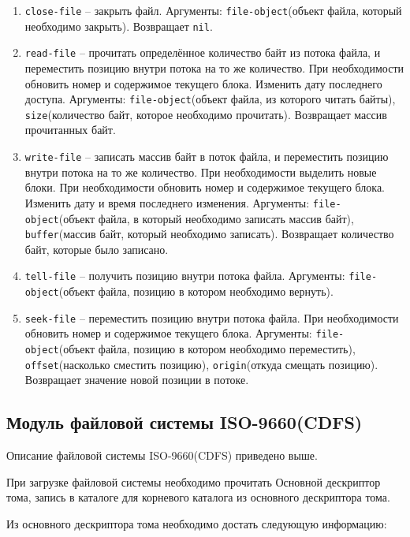 \begin{enumerate}
	\begin{enumerate}
	\item \texttt{close-file} -- закрыть файл. Аргументы: \texttt{file-object}(объект файла, который необходимо закрыть). Возвращает \texttt{nil}.
	\item \texttt{read-file} -- прочитать определённое количество байт из потока файла, и переместить позицию внутри потока на то же количество. При необходимости обновить номер и содержимое текущего блока. Изменить дату последнего доступа. Аргументы: \texttt{file-object}(объект файла, из которого читать байты), \texttt{size}(количество байт, которое необходимо прочитать). Возвращает массив прочитанных байт.
	\item \texttt{write-file} -- записать массив байт в поток файла, и переместить позицию внутри потока на то же количество. При необходимости выделить новые блоки. При необходимости обновить номер и содержимое текущего блока. Изменить дату и время последнего изменения. Аргументы: \texttt{file-object}(объект файла, в который необходимо записать массив байт), \texttt{buffer}(массив байт, который необходимо записать). Возвращает количество байт, которые было записано.
	\item \texttt{tell-file} -- получить позицию внутри потока файла. Аргументы: \texttt{file-object}(объект файла, позицию в котором необходимо вернуть).
	\item \texttt{seek-file} -- переместить позицию внутри потока файла. При необходимости обновить номер и содержимое текущего блока. Аргументы: \texttt{file-object}(объект файла, позицию в котором необходимо переместить), \texttt{offset}(насколько сместить позицию), \texttt{origin}(откуда смещать позицию). Возвращает значение новой позиции в потоке.	
	\end{enumerate}

\end{enumerate}

\subsection{Модуль файловой системы ISO-9660(CDFS)}

Описание файловой системы ISO-9660(CDFS) приведено выше.

При загрузке файловой системы необходимо прочитать Основной дескриптор тома, запись в каталоге для корневого каталога из основного дескриптора тома.

Из основного дескриптора тома необходимо достать следующую информацию:

